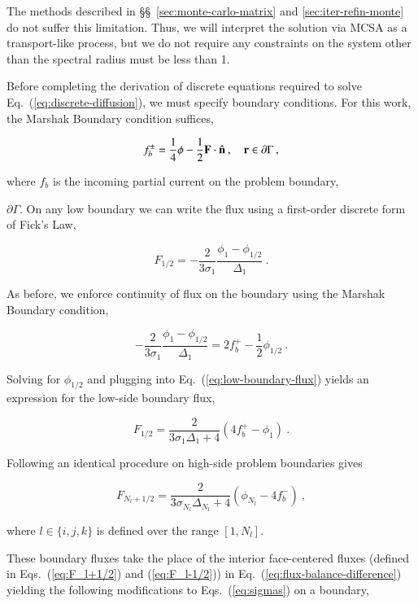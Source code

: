 \documentclass[preprint,12pt]{elsarticle}
\newcommand{\vr}{\ensuremath{\ve{r}}}
\begin{document}
The methods described in \S\S~\ref{sec:monte-carlo-matrix} and
\ref{sec:iter-refin-monte} do not suffer this limitation.  Thus, we
will interpret the solution via MCSA as a transport-like process, but
we do not require any constraints on the system other than the
spectral radius must be less than 1. 

Before completing the derivation of discrete equations required to
solve Eq.~(\ref{eq:discrete-diffusion}), we must specify boundary
conditions.  For this work, the Marshak Boundary condition suffices,

\begin{equation}
  f_b^\pm = \frac{1}{4}\phi - \frac{1}{2}\ve{F}\cdot\hat{\ve{n}}\:,\quad
  \vr\in \partial\Gamma\:,
\end{equation}

where $f_b$ is the incoming partial current on the problem boundary,

$\partial\Gamma$.  On any low boundary we can write the flux using a
first-order discrete form of Fick's Law,

\begin{equation}
  F_{1/2} = -\frac{2}{3\sigma_1}\frac{\phi_1 - \phi_{1/2}}{\Delta_1}\:.
  \label{eq:low-boundary-flux}
\end{equation}

As before, we enforce continuity of flux on the boundary using the
Marshak Boundary condition,

\begin{equation}
  -\frac{2}{3\sigma_1}\frac{\phi_1 - \phi_{1/2}}{\Delta_1} = 2f_b^{+}
  -\frac{1}{2}\phi_{1/2}\:. 
\end{equation}

Solving for $\phi_{1/2}$ and plugging into
Eq.~(\ref{eq:low-boundary-flux}) yields an expression for the low-side
boundary flux,

\begin{equation}
  F_{1/2} = \frac{2}{3\sigma_1\Delta_1 + 4}(4f_b^{+}-\phi_1)\:.
\end{equation}

Following an identical procedure on high-side problem boundaries gives

\begin{equation}
  F_{N_l+1/2} = \frac{2}{3\sigma_{N_l}\Delta_{N_l} +
    4}(\phi_{N_l}-4f_b^{-})\:, 
\end{equation}

where $l\in\{i,j,k\}$ is defined over the range $[1,N_l]$.

These boundary fluxes take the place of the interior face-centered
fluxes (defined in Eqs.~(\ref{eq:F_l+1/2}) and (\ref{eq:F_l-1/2})) in
Eq.~(\ref{eq:flux-balance-difference}) yielding the following
modifications to Eqs.~(\ref{eq:sigmas}) on a boundary,
\end{document}
